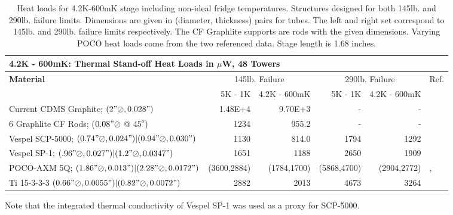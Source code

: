 \documentclass{article}
\begin{document}
\begin{table}[h]
\begin{small}
\begin{threeparttable}
\begin{tabular}{lrrrrl}
  \multicolumn{5}{l}{{\Large 4.2K - 600mK: Thermal Stand-off Heat Loads in $\mu$W, 48 Towers}} \\
\toprule
\bf{{\large Material}}& \multicolumn{2}{c}{145lb. Failure} & \multicolumn{2}{c}{290lb. Failure} & Ref.\\
\cmidrule(r){2-5}
& 5K - 1K & 4.2K - 600mK & 5K - 1K & 4.2K - 600mK & \\
Current CDMS Graphite; $(2"\oslash,0.028")$  & 1.48E+4 & 9.70E+3 & - & - & \cite{lem}\\
6 Graphlite CF Rods; ($0.08" \oslash$ @ $45^{o}$) & 1234 & 955.2 & - & - & \cite{run}\\
Vespel SCP-5000; $(0.74"\oslash,0.024")|(0.94"\oslash,0.030")$ & 1130\tnote{\dag} & 814.0\tnote{\dag} & 1794\tnote{\dag} & 1292\tnote{\dag} & \cite{run}\\
Vespel SP-1; $(.96"\oslash,0.027")|(1.2"\oslash,0.0347")$ & 1651 & 1188 & 2650 & 1909 & \cite{run}\\
POCO-AXM 5Q; $(1.86"\oslash,0.013")|(2.28"\oslash,0.0172")$ & (3600,2884) & (1784,1700) & (5868,4700) & (2904,2772) & \cite{woo:gr},\cite{run}\\
Ti 15-3-3-3 $(0.66"\oslash,0.0055")|(0.82"\oslash,0.0072")$ & 2882 & 2013 & 4673 & 3264 & \cite{wik}\\
\bottomrule
\end{tabular}
\begin{tablenotes}
\item[\dag] Note that the integrated thermal conductivity of Vespel SP-1 was used as a proxy for
    SCP-5000.
\end{tablenotes}
\end{threeparttable}
\caption{Heat loads for 4.2K-600mK stage including non-ideal fridge temperatures. Structures designed for both 145lb. and 290lb. failure limits. Dimensions are given in (diameter, thickness) pairs for tubes. The left and right set correspond to 145lb. and 290lb. failure limits respectively. The CF Graphlite supports are rods with the given dimensions. Varying POCO heat loads come from the two referenced data. Stage length is 1.68 inches.}
\end{small}
\end{table}
\end{document}
